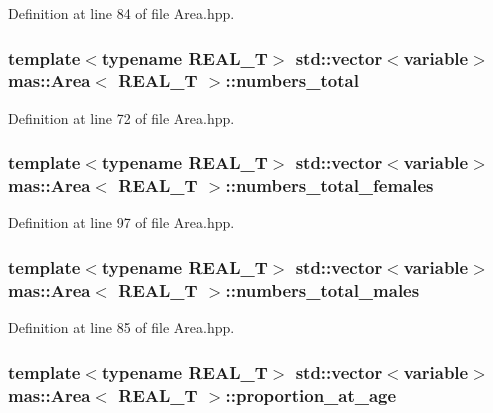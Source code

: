 Definition at line 84 of file Area.\-hpp.

\hypertarget{structmas_1_1_area_acb6bf1955e92c0864eee535a74ecb9bd}{
\subsubsection[{numbers\-\_\-total}]{\setlength{\rightskip}{0pt plus 5cm}template$<$typename R\-E\-A\-L\-\_\-\-T$>$ std\-::vector$<${\bf variable}$>$ {\bf mas\-::\-Area}$<$ R\-E\-A\-L\-\_\-\-T $>$\-::numbers\-\_\-total}}\label{structmas_1_1_area_acb6bf1955e92c0864eee535a74ecb9bd}


Definition at line 72 of file Area.\-hpp.

\hypertarget{structmas_1_1_area_a6ba5fdd790fe552bb732e8b81824c3d6}{
\subsubsection[{numbers\-\_\-total\-\_\-females}]{\setlength{\rightskip}{0pt plus 5cm}template$<$typename R\-E\-A\-L\-\_\-\-T$>$ std\-::vector$<${\bf variable}$>$ {\bf mas\-::\-Area}$<$ R\-E\-A\-L\-\_\-\-T $>$\-::numbers\-\_\-total\-\_\-females}}\label{structmas_1_1_area_a6ba5fdd790fe552bb732e8b81824c3d6}


Definition at line 97 of file Area.\-hpp.

\hypertarget{structmas_1_1_area_a8c1682e2c1ac46f6b6be45c68bc999c8}{
\subsubsection[{numbers\-\_\-total\-\_\-males}]{\setlength{\rightskip}{0pt plus 5cm}template$<$typename R\-E\-A\-L\-\_\-\-T$>$ std\-::vector$<${\bf variable}$>$ {\bf mas\-::\-Area}$<$ R\-E\-A\-L\-\_\-\-T $>$\-::numbers\-\_\-total\-\_\-males}}\label{structmas_1_1_area_a8c1682e2c1ac46f6b6be45c68bc999c8}


Definition at line 85 of file Area.\-hpp.

\hypertarget{structmas_1_1_area_a973d245c1b74dc6099d174c3afe5e661}{
\subsubsection[{proportion\-\_\-at\-\_\-age}]{\setlength{\rightskip}{0pt plus 5cm}template$<$typename R\-E\-A\-L\-\_\-\-T$>$ std\-::vector$<${\bf variable}$>$ {\bf mas\-::\-Area}$<$ R\-E\-A\-L\-\_\-\-T $>$\-::proportion\-\_\-at\-\_\-age}}\label{structmas_1_1_area_a973d245c1b74dc6099d174c3afe5e661}


